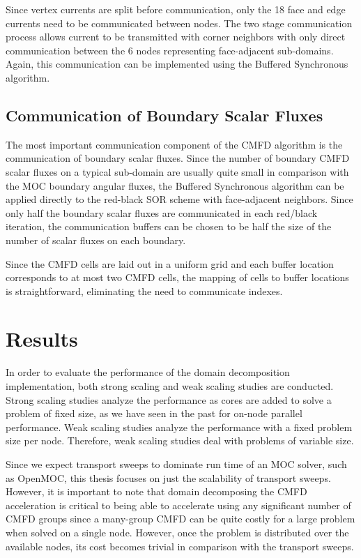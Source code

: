 Since vertex currents are split before communication, only the 18 face and edge currents need to be communicated between nodes. The two stage communication process allows current to be transmitted with corner neighbors with only direct communication between the 6 nodes representing face-adjacent sub-domains. Again, this communication can be implemented using the Buffered Synchronous algorithm.

\subsection{Communication of Boundary Scalar Fluxes}

The most important communication component of the \ac{CMFD} algorithm is the communication of boundary scalar fluxes. Since the number of boundary \ac{CMFD} scalar fluxes on a typical sub-domain are usually quite small in comparison with the \ac{MOC} boundary angular fluxes, the Buffered Synchronous algorithm can be applied directly to the red-black SOR scheme with face-adjacent neighbors. Since only half the boundary scalar fluxes are communicated in each red/black iteration, the communication buffers can be chosen to be half the size of the number of scalar fluxes on each boundary.

Since the \ac{CMFD} cells are laid out in a uniform grid and each buffer location corresponds to at most two \ac{CMFD} cells, the mapping of cells to buffer locations is straightforward, eliminating the need to communicate indexes.

\section{Results}
\label{sec:dd-results}

In order to evaluate the performance of the domain decomposition implementation, both strong scaling and weak scaling studies are conducted. Strong scaling studies analyze the performance as cores are added to solve a problem of fixed size, as we have seen in the past for on-node parallel performance. Weak scaling studies analyze the performance with a fixed problem size per node. Therefore, weak scaling studies deal with problems of variable size.

Since we expect transport sweeps to dominate run time of an \ac{MOC} solver, such as OpenMOC, this thesis focuses on just the scalability of transport sweeps. However, it is important to note that domain decomposing the \ac{CMFD} acceleration is critical to being able to accelerate using any significant number of \ac{CMFD} groups since a many-group \ac{CMFD} can be quite costly for a large problem when solved on a single node. However, once the problem is distributed over the available nodes, its cost becomes trivial in comparison with the transport sweeps.

